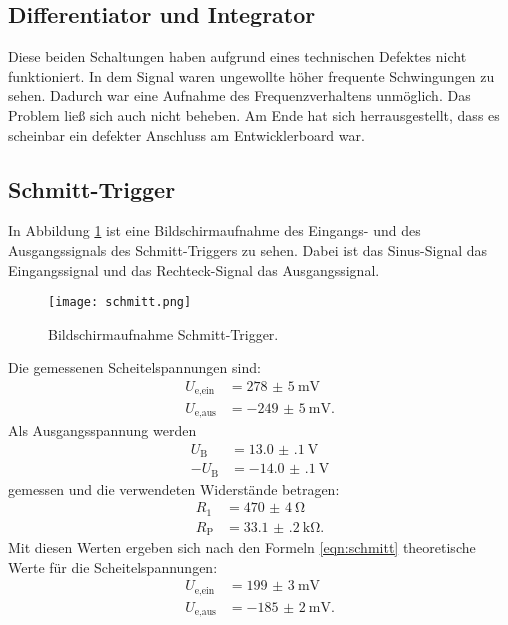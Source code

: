 \documentclass[
  bibliography=totoc,     %
  captions=tableheading,  %
  titlepage=firstiscover, %
]{scrartcl}
\begin{document}
\subsection{Differentiator und Integrator}
Diese beiden Schaltungen haben aufgrund eines technischen Defektes nicht funktioniert.
In dem Signal waren ungewollte höher frequente Schwingungen zu sehen.
Dadurch war eine Aufnahme des Frequenzverhaltens unmöglich. Das Problem ließ sich
auch nicht beheben. Am Ende hat sich herrausgestellt, dass es scheinbar ein defekter Anschluss
am Entwicklerboard war.

\subsection{Schmitt-Trigger}
In Abbildung \ref{fig:schmitttrigg} ist eine Bildschirmaufnahme des Eingangs- und
des Ausgangssignals des Schmitt-Triggers zu sehen. Dabei ist das Sinus-Signal das Eingangssignal
und das Rechteck-Signal das Ausgangssignal.
\begin{figure}[H]
  \centering
  \texttt{[image: schmitt.png]}
  \caption{Bildschirmaufnahme Schmitt-Trigger.}
  \label{fig:schmitttrigg}
\end{figure}
\noindent
Die gemessenen Scheitelspannungen sind:
\begin{align*}
  U_\text{e,ein} &= \SI{278(5)}{\milli\volt} \\
  U_\text{e,aus} &= \SI{-249(5)}{\milli\volt}.
\end{align*}
Als Ausgangsspannung werden
\begin{align*}
  U_\text{B} &= \SI{13.0(1)}{\volt} \\
  -U_\text{B} &= \SI{-14.0(1)}{\volt}
\end{align*}
gemessen und die verwendeten Widerstände betragen:
\begin{align*}
  R_1 &= \SI{470(4)}{\ohm} \\
  R_\text{P} &= \SI{33.1(2)}{\kilo\ohm}.
\end{align*}
Mit diesen Werten ergeben sich nach den Formeln \eqref{eqn:schmitt} theoretische
Werte für die Scheitelspannungen:
\begin{align*}
  U_\text{e,ein} &= \SI{199(3)}{\milli\volt} \\
  U_\text{e,aus} &= \SI{-185(2)}{\milli\volt}.
\end{align*}
\end{document}
